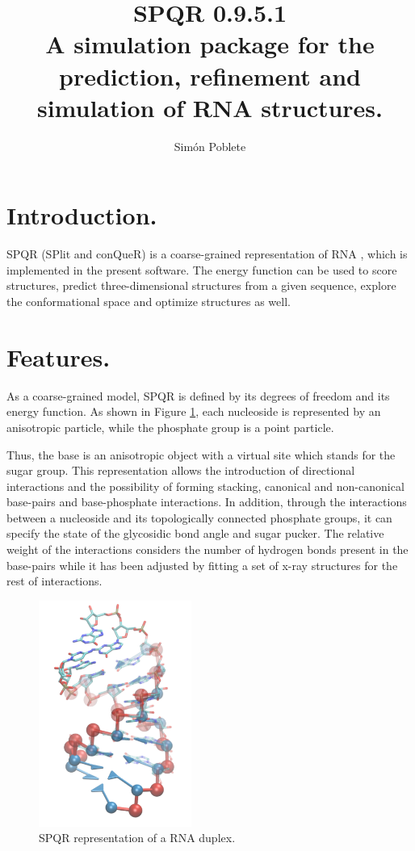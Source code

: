 \documentclass{article}
\title{SPQR 0.9.5.1\\A simulation package for the prediction, refinement and simulation of RNA structures.}
\author{Sim\'on Poblete}
\date{}
\begin{document}
\maketitle
\section{Introduction.}

SPQR (SPlit and conQueR) is a coarse-grained representation of RNA \cite{spqr1, spqr2}, which is implemented in the present software. The energy function can be used to score structures, predict three-dimensional structures from a given sequence, explore the conformational space and optimize structures as well. 



\section{Features.}




As a coarse-grained model, SPQR is defined by its degrees of freedom and its energy function. As shown in Figure \ref{cg-rep}, each nucleoside is represented by an anisotropic particle, while the phosphate group is a point particle.

Thus, the base is an anisotropic object with a virtual site which stands for the sugar group.
This representation allows the introduction of directional interactions and the possibility of forming stacking, canonical and non-canonical base-pairs and base-phosphate interactions. In addition, through the interactions between a nucleoside and its topologically connected phosphate groups, it can specify the state of the glycosidic bond angle and sugar pucker. The relative weight of the interactions considers the number of hydrogen bonds present in the base-pairs while it has been adjusted by fitting a set of x-ray structures for the rest of interactions.

\begin{figure}
\begin{center}
  \includegraphics[width=5cm]{src/rnacg.png}
  \caption{SPQR representation of a RNA duplex.}
\label{cg-rep}
\end{center}
\end{figure}
\end{document}
